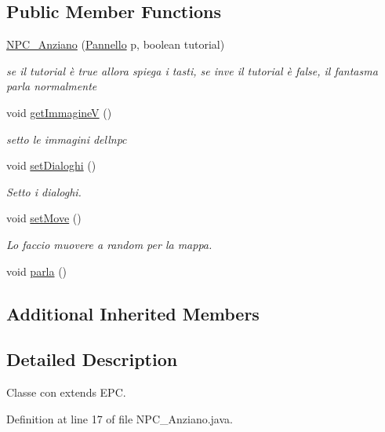 \subsection*{Public Member Functions}
\begin{DoxyCompactItemize}
\item 
\hyperlink{class_entita_1_1_n_p_c___anziano_aef11e153cf80a3e395b957010c566d6b}{N\+P\+C\+\_\+\+Anziano} (\hyperlink{classa_1_1survival_1_1game_1_1_pannello}{Pannello} p, boolean tutorial)
\begin{DoxyCompactList}\small\item\em se il tutorial è true allora spiega i tasti, se inve il tutorial è false, il fantasma parla normalmente \end{DoxyCompactList}\item 
void \hyperlink{class_entita_1_1_n_p_c___anziano_a3dc41fc873c15856e3f445fdb128aba0}{get\+ImmagineV} ()
\begin{DoxyCompactList}\small\item\em setto le immagini dell\textquotesingle{}npc \end{DoxyCompactList}\item 
void \hyperlink{class_entita_1_1_n_p_c___anziano_a63150f067e4d424060ac6d4b46fc0d9b}{set\+Dialoghi} ()
\begin{DoxyCompactList}\small\item\em Setto i dialoghi. \end{DoxyCompactList}\item 
void \hyperlink{class_entita_1_1_n_p_c___anziano_a447f807a76b7ea97a78cb76241fe8bc8}{set\+Move} ()
\begin{DoxyCompactList}\small\item\em Lo faccio muovere a random per la mappa. \end{DoxyCompactList}\item 
void \hyperlink{class_entita_1_1_n_p_c___anziano_a8310c90e226ac9bc11547a3adb9cd0f3}{parla} ()
\end{DoxyCompactItemize}
\subsection*{Additional Inherited Members}


\subsection{Detailed Description}
Classe con extends E\+PC. 

Definition at line 17 of file N\+P\+C\+\_\+\+Anziano.\+java.



